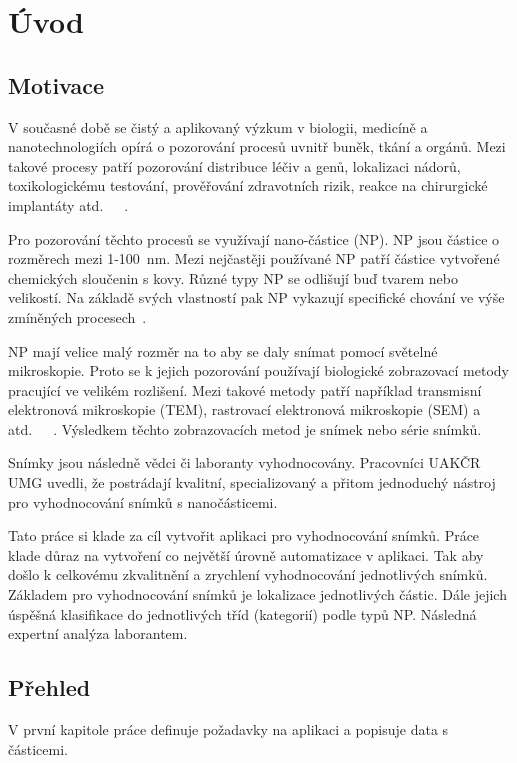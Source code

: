 \documentclass[11pt,twoside,a4paper,table]{book}
\begin{document}
\chapter*{Úvod}

\section{Motivace}
V současné době se čistý a aplikovaný výzkum v biologii, medicíně a nanotechnologiích opírá o pozorování procesů uvnitř buněk, tkání a orgánů. Mezi takové procesy patří pozorování distribuce léčiv a genů, lokalizaci nádorů, toxikologickému testování, prověřování zdravotních rizik, reakce na chirurgické implantáty atd.~\cite{np:ostrowski}~\cite{np:mayhew}~\cite{np:coloc}.

Pro pozorování těchto procesů se využívají nano-částice (NP). NP jsou částice o rozměrech mezi 1-100~nm. Mezi nejčastěji používané NP patří částice vytvořené chemických sloučenin s kovy. Různé typy NP se odlišují buď tvarem nebo velikostí. Na základě svých vlastností pak NP vykazují specifické chování ve výše zmíněných procesech~\cite{np:intro}.

NP mají velice malý rozměr na to aby se daly snímat pomocí světelné mikroskopie. Proto se k jejich pozorování používají biologické zobrazovací metody pracující ve velikém rozlišení. Mezi takové metody patří například transmisní elektronová mikroskopie (TEM), rastrovací elektronová mikroskopie (SEM) a atd.~\cite{np:ostrowski}~\cite{np:mayhew}~\cite{np:coloc}. Výsledkem těchto zobrazovacích metod je snímek nebo série snímků.

Snímky jsou následně vědci či laboranty vyhodnocovány. Pracovníci UAKČR UMG uvedli, že postrádají kvalitní, specializovaný a přitom jednoduchý nástroj pro vyhodnocování snímků s nanočásticemi.

Tato práce si klade za cíl vytvořit aplikaci pro vyhodnocování snímků. Práce klade důraz na vytvoření co největší úrovně automatizace v aplikaci. Tak aby došlo k celkovému zkvalitnění a zrychlení vyhodnocování jednotlivých snímků. Základem pro vyhodnocování snímků je lokalizace jednotlivých částic. Dále jejich úspěšná klasifikace do jednotlivých tříd (kategorií) podle typů NP. Následná expertní analýza laborantem.

\section{Přehled}
V první kapitole práce definuje požadavky na aplikaci a popisuje data s částicemi.
\end{document}
